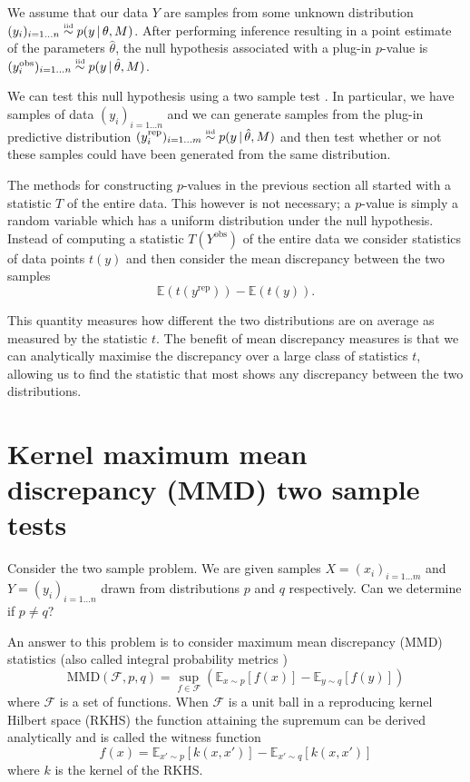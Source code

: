 We assume that our data $Y$ are \iid samples from some unknown distribution ${(y_i)_{i=1\ldots n} \overset{\mbox{\tiny iid}}{\sim} p(y\,|\, \theta, M)}$.
After performing inference resulting in a point estimate of the parameters $\hat\theta$, the null hypothesis associated with a plug-in $p$-value is ${(y^\textrm{obs}_i)_{i=1\ldots n} \overset{\mbox{\tiny iid}}{\sim} p(y \,|\, \hat\theta, M)}$.

We can test this null hypothesis using a two sample test \citep[e.g.][]{Friedman1979-ur, Bickel1969-ao, Hotelling1951-jd}.
In particular, we have samples of data $(y_i)_{i=1\ldots n}$ and we can generate samples from the plug-in predictive distribution ${(y_i^\textrm{rep})_{i=1\ldots m} \overset{\mbox{\tiny iid}}{\sim} p(y \,|\, \hat\theta, M)}$ and then test whether or not these samples could have been generated from the same distribution.

The methods for constructing $p$-values in the previous section all started with a statistic $T$ of the entire data.
This however is not necessary; a $p$-value is simply a random variable which has a uniform distribution under the null hypothesis.
Instead of computing a statistic $T(Y^\textrm{obs})$ of the entire data we consider statistics of data points $t(y)$ and then consider the mean discrepancy between the two samples
\begin{equation}
\mathbb{E}(t(y^\textrm{rep})) - \mathbb{E}(t(y)).
\end{equation}

This quantity measures how different the two distributions are on average as measured by the statistic $t$.
The benefit of mean discrepancy measures is that we can analytically maximise the discrepancy over a large class of statistics $t$, allowing us to find the statistic that most shows any discrepancy between the two distributions.

\section{Kernel maximum mean discrepancy (MMD) two sample tests}

Consider the two sample problem. We are given samples ${X = (x_i)_{i=1\ldots m}}$ and ${Y = (y_i)_{i=1\ldots n}}$ drawn \iid from distributions $p$ and $q$ respectively.
Can we determine if $p \neq q$?

An answer to this problem is to consider maximum mean discrepancy (MMD) \citep{Gretton2008-gs} statistics (also called integral probability metrics \citep{Muller1997-vs})
\begin{equation}
\textrm{MMD}(\mathcal{F},p,q) = \sup_{f \in \mathcal{F}}(\mathbb{E}_{x\sim p}[f(x)] - \mathbb{E}_{y\sim q}[f(y)])
\label{eq:MMD}
\end{equation}
where $\mathcal{F}$ is a set of functions.
When $\mathcal{F}$ is a unit ball in a reproducing kernel Hilbert space (RKHS) the function attaining the supremum can be derived analytically and is called the witness function
\begin{equation}
f(x) = \mathbb{E}_{x'\sim p}[k(x,x')] - \mathbb{E}_{x'\sim q}[k(x,x')]
\label{eq:witness}
\end{equation}
where $k$ is the kernel of the RKHS.

